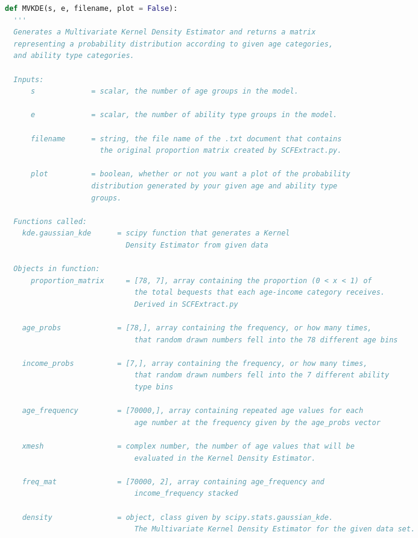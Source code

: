 \documentclass[letterpaper,12pt]{article}
\theoremstyle{definition}
\begin{document}
\begin{spacing}{1.5}
\begin{lstlisting}[language=Python, caption=MVKDE.py]
def MVKDE(s, e, filename, plot = False):
  '''
  Generates a Multivariate Kernel Density Estimator and returns a matrix
  representing a probability distribution according to given age categories,
  and ability type categories.

  Inputs:
      s             = scalar, the number of age groups in the model.

      e             = scalar, the number of ability type groups in the model.

      filename      = string, the file name of the .txt document that contains 
                      the original proportion matrix created by SCFExtract.py.

      plot          = boolean, whether or not you want a plot of the probability
                    distribution generated by your given age and ability type 
                    groups.
     
  Functions called: 
    kde.gaussian_kde      = scipy function that generates a Kernel 
                            Density Estimator from given data

  Objects in function:
      proportion_matrix     = [78, 7], array containing the proportion (0 < x < 1) of 
                              the total bequests that each age-income category receives. 
                              Derived in SCFExtract.py

    age_probs             = [78,], array containing the frequency, or how many times, 
                              that random drawn numbers fell into the 78 different age bins

    income_probs          = [7,], array containing the frequency, or how many times, 
                              that random drawn numbers fell into the 7 different ability 
                              type bins

    age_frequency         = [70000,], array containing repeated age values for each 
                              age number at the frequency given by the age_probs vector 

    xmesh                 = complex number, the number of age values that will be 
                              evaluated in the Kernel Density Estimator.

    freq_mat              = [70000, 2], array containing age_frequency and 
                              income_frequency stacked

    density               = object, class given by scipy.stats.gaussian_kde. 
                              The Multivariate Kernel Density Estimator for the given data set.


\end{lstlisting}
\end{spacing}
\end{document}

